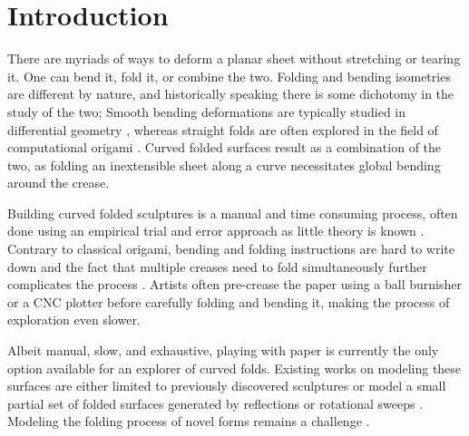 \section{Introduction}
There are myriads of ways to deform a planar sheet without stretching or tearing it. One can bend it, fold it, or combine the two. Folding and bending isometries are different by nature, and historically speaking there is some dichotomy in the study of the two; Smooth bending deformations are typically studied in differential geometry \cite{do_carmo}, whereas straight folds are often explored in the field of computational origami \cite{origami_book}. Curved folded surfaces \cite{huffman} result as a combination of the two, as folding an inextensible sheet along a curve necessitates global bending around the crease.

Building curved folded sculptures is a manual and time consuming process, often done using an empirical trial and error approach  as little theory is known \cite{curved_review,huffmann_reconstructing}. Contrary to classical origami, bending and folding instructions are hard to write down and the fact that multiple creases need to fold simultaneously further complicates the process \cite{StringActuated:2017}. Artists often pre-crease the paper using a ball burnisher or a CNC plotter before carefully folding and bending it, making the process of exploration even slower. 

Albeit manual, slow, and exhaustive, playing with paper is currently the only option available for an explorer of curved folds. Existing works on modeling these surfaces are either limited to previously discovered sculptures \cite{curved_folding_kilian,StringActuated:2017} or model a small partial set of folded surfaces generated by reflections or rotational sweeps \cite{Mitani_ref,mitani2009design}. Modeling the folding process of novel forms remains a challenge \cite{curved_review}. 

